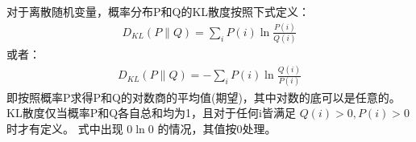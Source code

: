 \documentclass[letterpaper,10pt,english]{sphinxmanual}
\begin{document}
对于离散随机变量，概率分布P和Q的KL散度按照下式定义：
\begin{equation}\label{equation:指数族/content:指数族/content:31}
\begin{split}D_{KL}(P \parallel Q) = \sum_{i} P(i) \ln \frac{P(i)}{Q(i)}\end{split}
\end{equation}
或者：
\begin{equation}\label{equation:指数族/content:指数族/content:32}
\begin{split}D_{KL}(P \parallel Q) = -\sum_{i} P(i) \ln \frac{Q(i)}{P(i)}\end{split}
\end{equation}
即按照概率P求得P和Q的对数商的平均值(期望)，其中对数的底可以是任意的。
KL散度仅当概率P和Q各自总和均为1，且对于任何i皆满足
\(Q(i)>0,P(i)>0\) 时才有定义。
式中出现 \(0\ln 0\) 的情况，其值按0处理。
\end{document}
